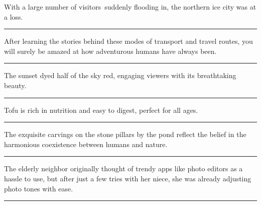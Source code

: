 \documentclass[11pt,a4paper]{article}
\newcommand{\num}[1]{\makebox[1.9em][r]{#1.}\hspace{0.3em}}
\newcommand{\wline}{\noindent\rule{\linewidth}{0.4pt}}
\begin{document}
\begin{minipage}{\linewidth}

\num{19}With a large number of visitors\ suddenly flooding in, the northern ice city was at a loss.

\vspace{0.25em}

\wline

\end{minipage}

\begin{minipage}{\linewidth}

\num{20}After learning the stories behind these modes of transport and travel routes, you will surely be amazed at how adventurous humans have always been.

\vspace{0.25em}

\wline

\end{minipage}

\vspace{0.35em}\vspace{0.15em}

\begin{minipage}{\linewidth}

\num{21}The sunset dyed half of the sky red, engaging viewers with its breathtaking beauty.

\vspace{0.25em}

\wline

\end{minipage}

\begin{minipage}{\linewidth}

\num{22}Tofu is rich in nutrition and easy to digest, perfect for all ages.

\vspace{0.25em}

\wline

\end{minipage}

\begin{minipage}{\linewidth}

\num{23}The exquisite carvings on the stone pillars by the pond reflect the belief in the harmonious coexistence between humans and nature.

\vspace{0.25em}

\wline

\end{minipage}

\begin{minipage}{\linewidth}

\num{24}The elderly neighbor originally thought of trendy apps like photo editors as a hassle to use, but after just a few tries with her niece, she was already adjusting photo tones with ease.

\vspace{0.25em}

\wline

\end{minipage}
\end{document}
